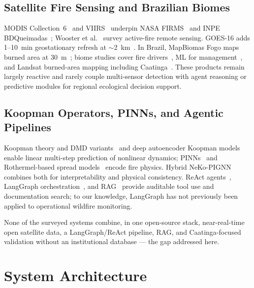 \documentclass[preprint,12pt,times,numbers]{elsarticle}
\begin{document}
\subsection{Satellite Fire Sensing and Brazilian Biomes}

MODIS Collection~6~\cite{article:giglio2016} and VIIRS~\cite{article:schroeder2014} underpin NASA FIRMS~\cite{manual:firms2024} and INPE BDQueimadas~\cite{article:inpe2023}; Wooster et al.~\cite{article:wooster2021} survey active-fire remote sensing. GOES-16 adds 1--10~min geostationary refresh at $\sim$2~km~\cite{techreport:goes2022}. In Brazil, MapBiomas Fogo maps burned area at 30~m~\cite{website:mapbiomas}; biome studies cover fire drivers~\cite{article:barlow2019,article:pivello2021}, ML for management~\cite{article:jain2020}, and Landsat burned-area mapping including Caatinga~\cite{article:alencar2022}. These products remain largely reactive and rarely couple multi-sensor detection with agent reasoning or predictive modules for regional ecological decision support.

\subsection{Koopman Operators, PINNs, and Agentic Pipelines}

Koopman theory and DMD variants~\cite{article:koopman1931,article:mezic2013,article:schmid2010,article:brunton2021} and deep autoencoder Koopman models~\cite{article:lusch2018} enable linear multi-step prediction of nonlinear dynamics; PINNs~\cite{article:raissi2019,article:karniadakis2021} and Rothermel-based spread models~\cite{article:rothermel1972,article:scott2001} encode fire physics. Hybrid NeKo-PIGNN combines both for interpretability and physical consistency. ReAct agents~\cite{article:react2023}, LangGraph orchestration~\cite{manual:langgraph2024}, and RAG~\cite{article:lewis2020,article:faiss2017} provide auditable tool use and documentation search; to our knowledge, LangGraph has not previously been applied to operational wildfire monitoring.

None of the surveyed systems combine, in one open-source stack, near-real-time open satellite data, a LangGraph/ReAct pipeline, RAG, and Caatinga-focused validation without an institutional database --- the gap addressed here.

\section{System Architecture}
\label{sec:architecture}
\end{document}
